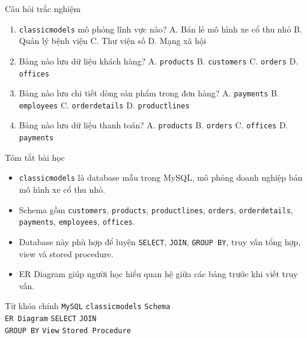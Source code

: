 \documentclass[aspectratio=169,professionalfonts]{beamer}
\newcommand{\code}[1]{\texttt{#1}}
\begin{document}
\begin{frame}{Câu hỏi trắc nghiệm}
\small
\begin{enumerate}
  \item \code{classicmodels} mô phỏng lĩnh vực nào?\newline
  A. Bán lẻ mô hình xe cổ thu nhỏ \quad B. Quản lý bệnh viện \quad C. Thư viện số \quad D. Mạng xã hội
  \item Bảng nào lưu dữ liệu khách hàng?\newline
  A. \code{products} \quad B. \code{customers} \quad C. \code{orders} \quad D. \code{offices}
  \item Bảng nào lưu chi tiết dòng sản phẩm trong đơn hàng?\newline
  A. \code{payments} \quad B. \code{employees} \quad C. \code{orderdetails} \quad D. \code{productlines}
  \item Bảng nào lưu dữ liệu thanh toán?\newline
  A. \code{products} \quad B. \code{orders} \quad C. \code{offices} \quad D. \code{payments}
\end{enumerate}
\end{frame}

\begin{frame}{Tóm tắt bài học}
\begin{itemize}
  \item \code{classicmodels} là database mẫu trong MySQL, mô phỏng doanh nghiệp bán mô hình xe cổ thu nhỏ.
  \item Schema gồm \code{customers}, \code{products}, \code{productlines}, \code{orders}, \code{orderdetails}, \code{payments}, \code{employees}, \code{offices}.
  \item Database này phù hợp để luyện \code{SELECT}, \code{JOIN}, \code{GROUP BY}, truy vấn tổng hợp, view và stored procedure.
  \item ER Diagram giúp người học hiểu quan hệ giữa các bảng trước khi viết truy vấn.
\end{itemize}
\end{frame}

\begin{frame}{Từ khóa chính}
\centering
\Large
\code{MySQL} \quad \code{classicmodels} \quad \code{Schema} \\
\vspace{0.5em}
\code{ER Diagram} \quad \code{SELECT} \quad \code{JOIN} \\
\vspace{0.5em}
\code{GROUP BY} \quad \code{View} \quad \code{Stored Procedure}
\end{frame}
\end{document}
